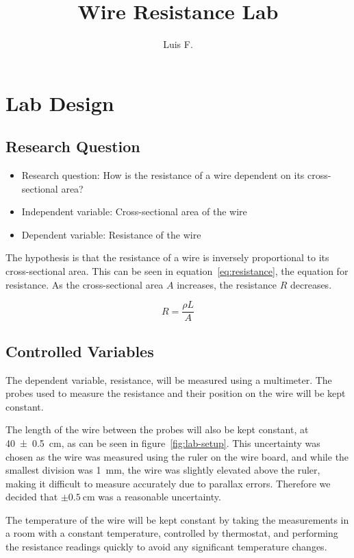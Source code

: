 \documentclass{article}
\author{Luis F.}
\title{Wire Resistance Lab}
\newcommand{\unc}[2]{\(\pm\SI{#1}{#2}\)}
\begin{document}
\maketitle

\section{Lab Design}
\subsection{Research Question}

\begin{itemize}
  \item Research question: How is the resistance of a wire dependent on its cross-sectional area?
  \item Independent variable: Cross-sectional area of the wire
  \item Dependent variable: Resistance of the wire
\end{itemize}

The hypothesis is that the resistance of a wire is inversely proportional to its cross-sectional area. This can be seen in equation~\ref{eq:resistance}, the equation for resistance. As the cross-sectional area \(A\) increases, the resistance \(R\) decreases.

\begin{equation}\label{eq:resistance}
  R = \frac{\rho L}{A}
\end{equation}

\subsection{Controlled Variables}

The dependent variable, resistance, will be measured using a multimeter. The probes used to measure the resistance and their position on the wire will be kept constant.

The length of the wire between the probes will also be kept constant, at \SI{40\pm0.5}{\centi\metre}, as can be seen in figure~\ref{fig:lab-setup}. This uncertainty was chosen as the wire was measured using the ruler on the wire board, and while the smallest division was \SI{1}{\milli\metre}, the wire was slightly elevated above the ruler, making it difficult to measure accurately due to parallax errors. Therefore we decided that \unc{0.5}{\centi\metre} was a reasonable uncertainty.

The temperature of the wire will be kept constant by taking the measurements in a room with a constant temperature, controlled by thermostat, and performing the resistance readings quickly to avoid any significant temperature changes.
\end{document}
